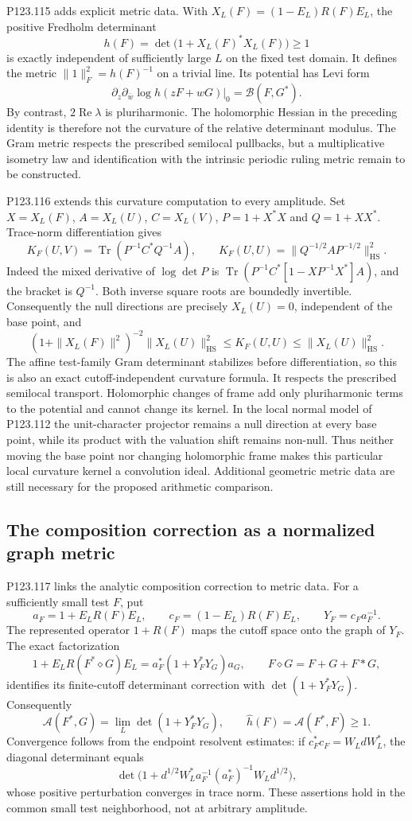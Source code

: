 P123.115 adds explicit metric data. With
$X_L(F)=(1-E_L)R(F)E_L$, the positive Fredholm determinant
\[
 h(F)=\det\bigl(1+X_L(F)^*X_L(F)\bigr)\geq1
\]
is exactly independent of sufficiently large $L$ on the fixed test
domain. It defines the metric $\|1\|_F^2=h(F)^{-1}$ on a trivial line.
Its potential has Levi form
\[
 \left.\partial_z\partial_{\bar w}\log h(zF+wG)\right|_0
       =\mathcal B(F,G^*).
\]
By contrast, $2\operatorname{Re}\lambda$ is pluriharmonic. The
holomorphic Hessian in the preceding identity is therefore not the
curvature of the relative determinant modulus. The Gram metric
respects the prescribed semilocal pullbacks, but a multiplicative
isometry law and identification with the intrinsic periodic ruling
metric remain to be constructed.

P123.116 extends this curvature computation to every amplitude. Set
$X=X_L(F)$, $A=X_L(U)$, $C=X_L(V)$, $P=1+X^*X$ and
$Q=1+XX^*$. Trace-norm differentiation gives
\[
 K_F(U,V)=\operatorname{Tr}(P^{-1}C^*Q^{-1}A),\qquad
 K_F(U,U)=\|Q^{-1/2}AP^{-1/2}\|_{\mathrm{HS}}^2.
\]
Indeed the mixed derivative of $\log\det P$ is
$\operatorname{Tr}(P^{-1}C^*[1-XP^{-1}X^*]A)$, and the bracket
is $Q^{-1}$. Both inverse square roots are boundedly invertible.
Consequently the null directions are precisely $X_L(U)=0$,
independent of the base point, and
\[
 (1+\|X_L(F)\|^2)^{-2}\|X_L(U)\|_{\mathrm{HS}}^2
 \leq K_F(U,U)\leq\|X_L(U)\|_{\mathrm{HS}}^2.
\]
The affine test-family Gram determinant stabilizes before differentiation,
so this is also an exact cutoff-independent curvature formula. It
respects the prescribed semilocal transport. Holomorphic changes of
frame add only pluriharmonic terms to the potential and cannot change
its kernel. In the local normal model of P123.112 the unit-character
projector remains a null direction at every base point, while its
product with the valuation shift remains non-null. Thus neither moving
the base point nor changing holomorphic frame makes this particular
local curvature kernel a convolution ideal. Additional geometric metric
data are still necessary for the proposed arithmetic comparison.

\subsection{The composition correction as a normalized graph metric}
P123.117 links the analytic composition correction to metric data.
For a sufficiently small test $F$, put
\[
 a_F=1+E_LR(F)E_L,\qquad c_F=(1-E_L)R(F)E_L,
 \qquad Y_F=c_Fa_F^{-1}.
\]
The represented operator $1+R(F)$ maps the cutoff space onto the graph
of $Y_F$. The exact factorization
\[
 1+E_LR(F^*\mathbin{\diamond}G)E_L
       =a_F^*(1+Y_F^*Y_G)a_G,
 \qquad F\mathbin{\diamond}G=F+G+F*G,
\]
identifies its finite-cutoff determinant correction with
$\det(1+Y_F^*Y_G)$. Consequently
\[
 \mathcal A(F^*,G)=\lim_L\det(1+Y_F^*Y_G),\qquad
 \widehat h(F)=\mathcal A(F^*,F)\geq1.
\]
Convergence follows from the endpoint resolvent estimates: if
$c_F^*c_F=W_LdW_L^*$, the diagonal determinant equals
\[
 \det\bigl(1+d^{1/2}W_L^*a_F^{-1}(a_F^*)^{-1}W_Ld^{1/2}\bigr),
\]
whose positive perturbation converges in trace norm. These assertions
hold in the common small test neighborhood, not at arbitrary amplitude.

